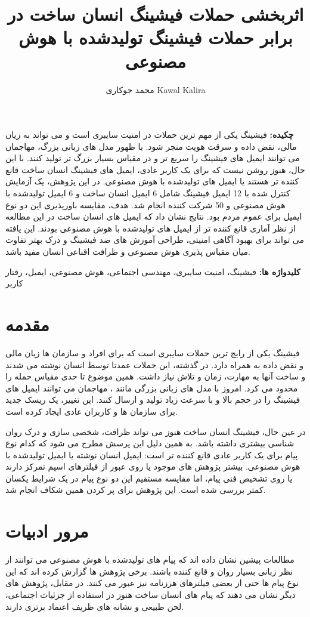 \documentclass[10pt,twocolumn]{article}
\title{اثربخشی حملات فیشینگ انسان ساخت در برابر حملات فیشینگ تولیدشده با هوش مصنوعی\\
\large \lr{Effectiveness of Human-Crafted vs AI-Generated Phishing Attacks}}
\author{محمد جوکاری \lr{(Mohammed Jowkari)} \qquad Kawal Kalira\\
\lr{British Columbia Institute of Technology (BCIT), Vancouver, BC, Canada}}
\date{}
\begin{document}
\maketitle

\noindent\textbf{چکیده:} فیشینگ یکی از مهم ترین حملات در امنیت سایبری است و می تواند به زیان مالی، نقض داده و سرقت هویت منجر شود. با ظهور مدل های زبانی بزرگ، مهاجمان می توانند ایمیل های فیشینگ را سریع تر و در مقیاس بسیار بزرگ تر تولید کنند. با این حال، هنوز روشن نیست که برای یک کاربر عادی، ایمیل های فیشینگ انسان ساخت قانع کننده تر هستند یا ایمیل های تولیدشده با هوش مصنوعی. در این پژوهش، یک آزمایش کنترل شده با 12 ایمیل فیشینگ شامل 6 ایمیل انسان ساخت و 6 ایمیل تولیدشده با هوش مصنوعی و 50 شرکت کننده انجام شد. هدف، مقایسه باورپذیری این دو نوع ایمیل برای عموم مردم بود. نتایج نشان داد که ایمیل های انسان ساخت در این مطالعه از نظر آماری قانع کننده تر از ایمیل های تولیدشده با هوش مصنوعی بودند. این یافته می تواند برای بهبود آگاهی امنیتی، طراحی آموزش های ضد فیشینگ و درک بهتر تفاوت میان مقیاس پذیری هوش مصنوعی و ظرافت اقناعی انسان مفید باشد.

\noindent\textbf{کلیدواژه ها:} فیشینگ، امنیت سایبری، مهندسی اجتماعی، هوش مصنوعی، ایمیل، رفتار کاربر

\section{مقدمه}
فیشینگ یکی از رایج ترین حملات سایبری است که برای افراد و سازمان ها زیان مالی و نقض داده به همراه دارد. در گذشته، این حملات عمدتا توسط انسان نوشته می شدند و ساخت آنها به مهارت، زمان و تلاش نیاز داشت. همین موضوع تا حدی مقیاس حمله را محدود می کرد. امروز با مدل های زبانی بزرگی مانند ، مهاجمان می توانند ایمیل های فیشینگ را در حجم بالا و با سرعت زیاد تولید و ارسال کنند. این تغییر، یک ریسک جدید برای سازمان ها و کاربران عادی ایجاد کرده است.

در عین حال، فیشینگ انسان ساخت هنوز می تواند ظرافت، شخصی سازی و درک روان شناسی بیشتری داشته باشد. به همین دلیل این پرسش مطرح می شود که کدام نوع پیام برای یک کاربر عادی قانع کننده تر است: ایمیل انسان نوشته یا ایمیل تولیدشده با هوش مصنوعی. بیشتر پژوهش های موجود یا روی عبور از فیلترهای اسپم تمرکز دارند یا روی تشخیص فنی پیام، اما مقایسه مستقیم این دو نوع پیام در یک شرایط یکسان کمتر بررسی شده است. این پژوهش برای پر کردن همین شکاف انجام شد.

\section{مرور ادبیات}
مطالعات پیشین نشان داده اند که پیام های تولیدشده با هوش مصنوعی می توانند از نظر زبانی بسیار روان و قانع کننده باشند. برخی پژوهش ها گزارش کرده اند که این نوع پیام ها حتی از بعضی فیلترهای هرزنامه نیز عبور می کنند. در مقابل، پژوهش های دیگر نشان می دهند که پیام های انسان ساخت هنوز در استفاده از جزئیات اجتماعی، لحن طبیعی و نشانه های ظریف اعتماد برتری دارند.
\end{document}
